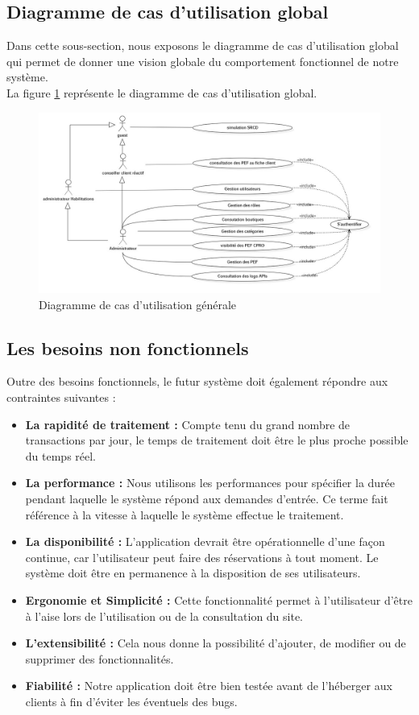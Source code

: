 \subsection[Diagramme de cas d’utilisation global]{Diagramme de cas d’utilisation global}
Dans cette sous-section, nous exposons le diagramme de cas d’utilisation global qui permet de donner une vision globale du comportement fonctionnel de notre système.\\
La figure \ref{fig:usecasediagram-global} représente le diagramme de cas d’utilisation global.
\begin{figure}[H]
	\centering
	\includegraphics[width=1.1\linewidth]{img/conception/usecases/UseCaseDiagram-global}
	\caption[Diagramme de cas d'utilisation générale]{Diagramme de cas d'utilisation générale}
	\label{fig:usecasediagram-global}
\end{figure}
\subsection[Les besoins non fonctionnels]{Les besoins non fonctionnels}
Outre des besoins fonctionnels, le futur système doit également répondre aux contraintes suivantes :
\begin{itemize}
	\item \textbf{La rapidité de traitement :} Compte tenu du grand nombre de transactions par jour, le temps de traitement doit être le plus proche possible du temps réel.
	\item \textbf{La performance :} Nous utilisons les performances pour spécifier la durée pendant laquelle le système répond aux demandes d'entrée. Ce terme fait référence à la vitesse à laquelle le système effectue le traitement.
	\item \textbf{La disponibilité :} L'application devrait être opérationnelle d'une façon continue, car l’utilisateur peut faire des réservations à tout moment. Le système doit être en permanence à la disposition de ses utilisateurs.
	\item \textbf{Ergonomie et Simplicité :} Cette fonctionnalité permet à l’utilisateur d’être à l’aise lors de l’utilisation ou de la consultation du site.
	\item \textbf{L’extensibilité :} Cela nous donne la possibilité d’ajouter, de modifier ou de supprimer des fonctionnalités.
	\item \textbf{Fiabilité :} Notre application doit être bien testée avant de l’héberger aux clients à fin d’éviter les éventuels des bugs.
\end{itemize}

